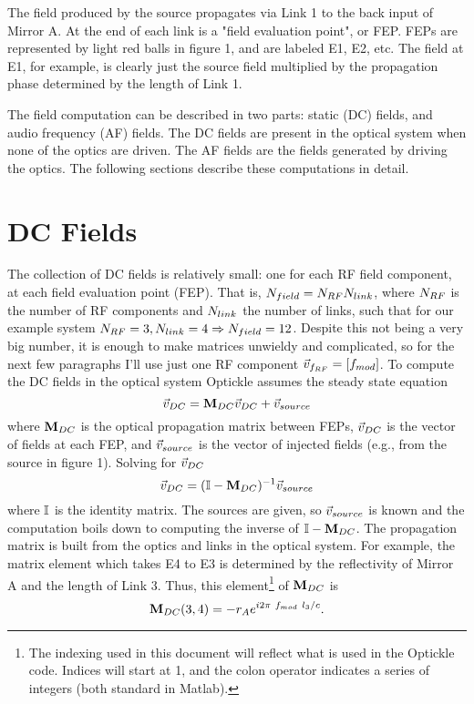 \documentclass[12pt]{article}
\begin{document}
The field produced by the source propagates via Link 1 to the back input of Mirror A.
At the end of each link is a "field evaluation point", or FEP.
FEPs are represented by light red balls in figure 1, and are labeled E1, E2, etc.
The field at E1, for example, is clearly just the source field multiplied by the propagation phase determined by the length of Link 1.

The field computation can be described in two parts:  static (DC) fields, and audio frequency (AF) fields.
The DC fields are present in the optical system when none of the optics are driven.
The AF fields are the fields generated by driving the optics.
The following sections describe these computations in detail.

\section{DC Fields}

The collection of DC fields is relatively small:  one for each RF field component, at each field evaluation point (FEP).
That is, $N_{field} = N_{RF} N_{link}$, where $N_{RF}$ is the number of RF components and $N_{link}$ the number of links, such that for our example system $N_{RF} = 3, N_{link} = 4 \Rightarrow N_{field} = 12$.
Despite this not being a very big number, it is enough to make matrices unwieldy and complicated, so for the next few paragraphs I'll use just one RF component $\vec{v}_{f_{RF}} = \left[ f_{mod} \right]$.
To compute the DC fields in the optical system Optickle assumes the steady state equation
\begin{equation}
\vec{v}_{DC} = \mathbf{M}_{DC} \vec{v}_{DC} + \vec{v}_{source}
\end{equation}
where $\mathbf{M}_{DC}$ is the optical propagation matrix between FEPs, $\vec{v}_{DC}$ is the vector of fields at each FEP, and $\vec{v}_{source}$ is the vector of injected fields (e.g., from the source in figure 1).
Solving for $\vec{v}_{DC}$
\begin{equation}
\vDC = (\matI - \mDC)^{-1} \vSrc
\elabel{vDC}
\end{equation}
where $\mathbb{I}$ is the identity matrix.
The sources are given, so $\vec{v}_{source}$ is known and the computation boils down to computing the inverse of  $\mathbb{I} - \mathbf{M}_{DC}$.
The propagation matrix is built from the optics and links in the optical system.
For example, the matrix element which takes E4 to E3 is determined by the reflectivity of Mirror A and the length of Link 3.  Thus, this element\footnote{The indexing used in this document will reflect what is used in the Optickle code.
Indices will start at 1, and the colon operator indicates a series of integers (both standard in Matlab).}
of $\mathbf{M}_{DC}$ is
\begin{equation}
\mathbf{M}_{DC}(3,4) = -r_A e^{i 2 \pi ~ f_{mod} ~ l_3 / c}.
\end{equation}
\end{document}
